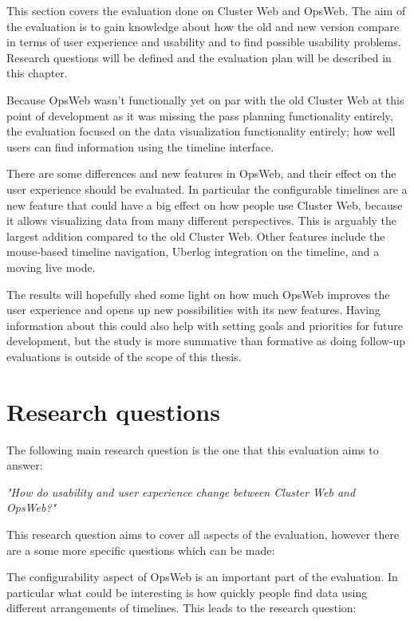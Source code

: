 
This section covers the evaluation done on Cluster Web and OpsWeb. The aim of the evaluation is to gain knowledge about how the old and new version compare in terms of user experience and usability and to find possible usability problems. Research questions will be defined and the evaluation plan will be described in this chapter.

Because OpsWeb wasn't functionally yet on par with the old Cluster Web at this point of development as it was missing the pass planning functionality entirely, the evaluation focused on the data visualization functionality entirely; how well users can find information using the timeline interface.

There are some differences and new features in OpsWeb, and their effect on the user experience should be evaluated. In particular the configurable timelines are a new feature that could have a big effect on how people use Cluster Web, because it allows visualizing data from many different perspectives. This is arguably the largest addition compared to the old Cluster Web. Other features include the mouse-based timeline navigation, Uberlog integration on the timeline, and a moving live mode.

The results will hopefully shed some light on how much OpsWeb improves the user experience and opens up new possibilities with its new features. Having information about this could also help with setting goals and priorities for future development, but the study is more summative than formative as doing follow-up evaluations is outside of the scope of this thesis. \cite{albert2013measuring}

\section{Research questions} \label{research_questions}
The following main research question is the one that this evaluation aims to answer:

\textit{"How do usability and user experience change between Cluster Web and OpsWeb?"}

This research question aims to cover all aspects of the evaluation, however there are a some more specific questions which can be made:

The configurability aspect of OpsWeb is an important part of the evaluation. In particular what could be interesting is how quickly people find data using different arrangements of timelines. This leads to the research question:

